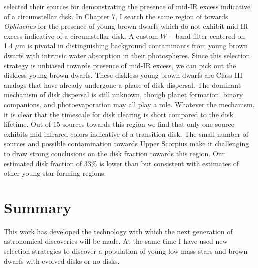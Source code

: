 \citet{allers06} selected their sources for demonstrating the presence of mid-IR excess indicative of a circumstellar disk.  In Chapter 7, I search the same region of \citet{allers06} towards \emph{Ophiuchus} for the presence of young brown dwarfs which do not exhibit mid-IR excess indicative of a circumstellar disk.  A custom $W-$band filter centered on 1.4 $\mu$m is pivotal in distinguishing background contaminants from young brown dwarfs with intrinsic water absorption in their photospheres.  Since this selection strategy is unbiased towards presence of mid-IR excess, we can pick out the diskless young brown dwarfs.  These diskless young brown dwarfs are Class III analogs that have already undergone a phase of disk dispersal.  The dominant mechanism of disk dispersal is still unknown, though planet formation, binary companions, and photoevaporation may all play a role.  Whatever the mechanism, it is clear that the timescale for disk clearing is short compared to the disk lifetime.  Out of 15 sources towards this region we find that only one source exhibits mid-infrared colors indicative of a transition disk.  The small number of sources and possible contamination towards Upper Scorpius make it challenging to draw strong conclusions on the disk fraction towards this region.  Our estimated disk fraction of 33\% is lower than but consistent with estimates of other young star forming regions.

\section{Summary}
This work has developed the technology with which the next generation of astronomical discoveries will be made.  At the same time I have used new selection strategies to discover a population of young low mass stars and brown dwarfs with evolved disks or no disks.
